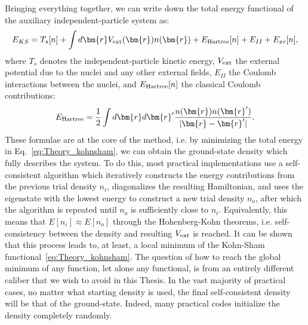 Bringing everything together, we can write down the total energy functional of the auxiliary independent-particle system as:
\begin{equation}
	\label{eq:Theory_kohnsham}
	E_{KS} = T_s[n] + \int d\bm{r} V_{\rm ext}(\bm{r}) n(\bm{r}) + E_{\rm Hartree}[n] + E_{II} + E_{xc}[n],
\end{equation}
where $T_s$ denotes the independent-particle kinetic energy, $V_{\rm ext}$ the external potential due to the nuclei and any other external fields, $E_{II}$ the Coulomb interactions between the nuclei, and $E_{\rm Hartree}[n]$ the classical Coulomb contributions:
\begin{equation}
	E_{\rm Hartree} = \frac{1}{2}\int d\bm{r}d\bm{r}' \frac{n(\bm{r})n(\bm{r}')}{|\bm{r} - \bm{r}'|}.
\end{equation}
These formulae are at the core of the method, i.e. by minimizing the total energy in Eq.~\eqref{eq:Theory_kohnsham}, we can obtain the ground-state density which fully describes the system.
To do this, most practical implementations use a self-consistent algorithm which iteratively constructs the energy contributions from the previous trial density $n_i$, diagonalizes the resulting Hamiltonian, and uses the eigenstate with the lowest energy to construct a new trial density $n_o$, after which the algorithm is repeated until $n_o$ is sufficiently close to $n_i$. Equivalently, this means that $E[n_i] \approx E[n_o]$ through the Hohenberg-Kohn theorems, i.e. self-consistency between the density and resulting $V_{\rm ext}$ is reached.
It can be shown that this process leads to, at least, a local minimum of the Kohn-Sham functional~\eqref{eq:Theory_kohnsham}.
The question of how to reach the global minimum of any function, let alone any functional, is from an entirely different caliber that we wish to avoid in this Thesis.
In the vast majority of practical cases, no matter what starting density is used, the final self-consistent density will be that of the ground-state. Indeed, many practical codes initialize the density completely randomly. 

